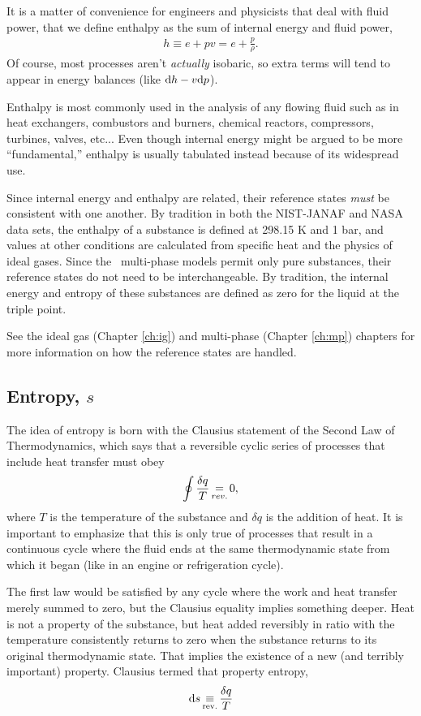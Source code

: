 It is a matter of convenience for engineers and physicists that deal with fluid power, that we define enthalpy as the sum of internal energy and fluid power,
\begin{align}
h \equiv e + pv = e + \frac{p}{\rho}.\label{eqn:intro:h}
\end{align}
Of course, most processes aren't \emph{actually} isobaric, so extra terms will tend to appear in energy balances (like $\mathrm{d} h - v \mathrm{d} p$).

Enthalpy is most commonly used in the analysis of any flowing fluid such as in heat exchangers, combustors and burners, chemical reactors, compressors, turbines, valves, etc...  Even though internal energy might be argued to be more ``fundamental,'' enthalpy is usually tabulated instead because of its widespread use.

Since internal energy and enthalpy are related, their reference states \emph{must} be consistent with one another.  By tradition in both the NIST-JANAF and NASA data sets, the enthalpy of a substance is defined at 298.15 K and 1 bar, and values at other conditions are calculated from specific heat and the physics of ideal gases.  Since the \PM\ multi-phase models permit only pure substances, their reference states do not need to be interchangeable.  By tradition, the internal energy and entropy of these substances are defined as zero for the liquid at the triple point.

See the ideal gas (Chapter \ref{ch:ig}) and multi-phase (Chapter \ref{ch:mp}) chapters for more information on how the reference states are handled.

\subsection{Entropy, $s$}\label{sec:intro:s}

The idea of entropy is born with the Clausius statement of the Second Law of Thermodynamics, which says that a reversible cyclic series of processes that include heat transfer must obey
\begin{align}
\oint \frac{\delta q}{T} \operatorname*{=}_{rev.} 0,
\end{align}
where $T$ is the temperature of the substance and $\delta q$ is the addition of heat.  It is important to emphasize that this is only true of processes that result in a continuous cycle where the fluid ends at the same thermodynamic state from which it began (like in an engine or refrigeration cycle).

The first law would be satisfied by any cycle where the work and heat transfer merely summed to zero, but the Clausius equality implies something deeper.  Heat is not a property of the substance, but heat added reversibly in ratio with the temperature consistently returns to zero when the substance returns to its original thermodynamic state.  That implies the existence of a new (and terribly important) property.  Clausius termed that property entropy,
\begin{align}
\mathrm{d} s \operatorname*{\equiv}_\mathrm{rev.} \frac{\delta q}{T}\label{eqn:intro:s}
\end{align}

